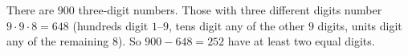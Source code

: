 There are $900$ three-digit numbers. Those with three different digits number $9\cdot9\cdot8=648$ (hundreds digit $1$--$9$, tens digit any of the other $9$ digits, units digit any of the remaining $8$). So $900-648=\boxed{252}$ have at least two equal digits.
